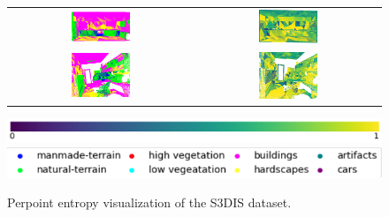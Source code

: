 \begin{figure}[h!]
\begin{tabular}{cc}
            \includegraphics[width=0.33\textwidth, height=0.18\textheight]{images/seg_output/s3dis_DE/S3DIS_3_Pred.png}& 
            \includegraphics[width=0.33\textwidth, height=0.18\textheight]{images/seg_output/flipout/ent_de_s3dis_2.png}\\

            \includegraphics[width=0.33\textwidth, height=0.18\textheight]{images/seg_output/s3dis_DE/S3DIS_4_Pred.png}& 
            \includegraphics[width=0.33\textwidth, height=0.18\textheight]{images/seg_output/flipout/ent_de_s3dis_4.png}\\
        \end{tabular}
        \includegraphics[scale=0.45]{images/prob_legend.pdf}
        \includegraphics[scale=0.65]{images/legend.png}
        \caption{Perpoint entropy visualization of the S3DIS dataset.}
        \label{fig:de_s3dis_entmap}
    \end{figure}
